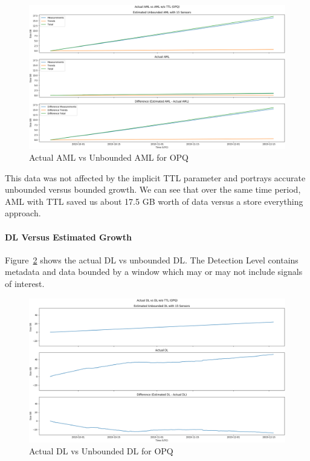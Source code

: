 \begin{figure}[H]
    \centering
    \includegraphics[width=\linewidth]{figures/actual_aml_vs_unbounded_opq.png}
    \caption{Actual AML vs Unbounded AML for OPQ}
    \label{fig:actual_aml_vs_unbounded_opq}
\end{figure}

This data was not affected by the implicit TTL parameter and portrays accurate unbounded versus bounded growth. We can see that over the same time period, AML with TTL saved us about 17.5 GB worth of data versus a store everything approach.

\paragraph{DL Versus Estimated Growth}
Figure~\ref{fig:actual_dl_vs_unbounded_opq} shows the actual DL vs unbounded DL. The Detection Level contains metadata and data bounded by a window which may or may not include signals of interest.

\begin{figure}[H]
    \centering
    \includegraphics[width=\linewidth]{figures/actual_dl_vs_unbounded_opq.png}
    \caption{Actual DL vs Unbounded DL for OPQ}
    \label{fig:actual_dl_vs_unbounded_opq}
\end{figure}

